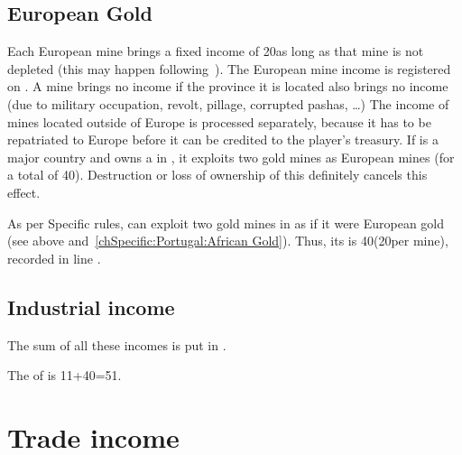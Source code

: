 \subsection{European Gold}
\aparag Each European mine brings a fixed income of 20\ducats as long as
that mine is not depleted (this may happen following~). The European mine income is registered on
.
\bparag A mine brings no income if the province it is located also
brings no income (due to military occupation, revolt, pillage,
corrupted pashas, \ldots)
\aparag The income of mines located outside of Europe is processed
separately, because it has to be repatriated to Europe before it can be
credited to the player's treasury.
 If \POR is a major country
and owns a \TP in , it exploits two gold mines
as European mines (for a total of 40\ducats). Destruction or loss of
ownership of this \TP definitely cancels this effect.

\begin{exemple}
  As per Specific rules, \POR can exploit two gold mines in
   as if it were European gold (see above
  and~\ref{chSpecific:Portugal:African Gold}). Thus, its  is 40\ducats (20\ducats per mine), recorded in line
  .
\end{exemple}

\subsection{Industrial income}
\aparag The sum of all these incomes is put in .

\begin{exemple}
  The  of \POR is 11+40=51\ducats.
\end{exemple}

\section{Trade income}\label{chIncomes:Trade Income}
